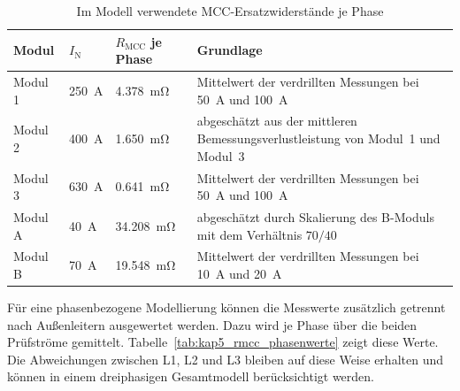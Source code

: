 \begin{table}[H]
    \centering
    \caption{Im Modell verwendete MCC-Ersatzwiderstände je Phase}
    \label{tab:kap5_rmcc_parameter}
    \begin{tabularx}{\textwidth}{@{}p{}
        p{}p{}X@{}}
        \toprule
        Modul & \(I_\mathrm{N}\) & \(R_\mathrm{MCC}\) je Phase & Grundlage \\
        \midrule
        Modul 1 &
        \SI{250}{\ampere} &
        \SI{4.378}{\milli\ohm} &
        Mittelwert der verdrillten Messungen bei
        \SI{50}{\ampere} und \SI{100}{\ampere} \\

        Modul 2 &
        \SI{400}{\ampere} &
        \SI{1.650}{\milli\ohm} &
        abgeschätzt aus der mittleren Bemessungsverlustleistung von
        Modul~1 und Modul~3 \\

        Modul 3 &
        \SI{630}{\ampere} &
        \SI{0.641}{\milli\ohm} &
        Mittelwert der verdrillten Messungen bei
        \SI{50}{\ampere} und \SI{100}{\ampere} \\

        Modul A &
        \SI{40}{\ampere} &
        \SI{34.208}{\milli\ohm} &
        abgeschätzt durch Skalierung des B-Moduls mit dem Verhältnis
        \(70/40\) \\

        Modul B &
        \SI{70}{\ampere} &
        \SI{19.548}{\milli\ohm} &
        Mittelwert der verdrillten Messungen bei
        \SI{10}{\ampere} und \SI{20}{\ampere} \\
        \bottomrule
    \end{tabularx}
\end{table}

Für eine phasenbezogene Modellierung können die Messwerte zusätzlich getrennt
nach Außenleitern ausgewertet werden. Dazu wird je Phase über die beiden
Prüfströme gemittelt. Tabelle~\ref{tab:kap5_rmcc_phasenwerte} zeigt diese
Werte. Die Abweichungen zwischen L1, L2 und L3 bleiben auf diese Weise
erhalten und können in einem dreiphasigen Gesamtmodell berücksichtigt werden.

